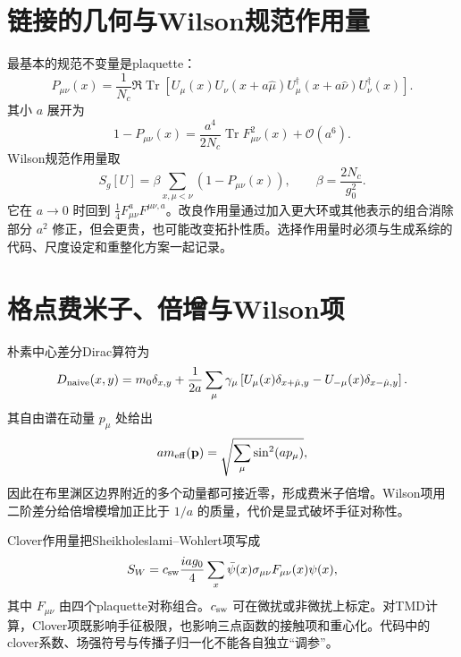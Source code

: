 \documentclass[UTF8,12pt,a4paper,twoside,openany]{ctexbook}
\newcommand{\Tr}{\operatorname{Tr}}
\begin{document}
\section{链接的几何与Wilson规范作用量}

最基本的规范不变量是plaquette：
\begin{equation}
  P_{\mu\nu}(x)
  =\frac{1}{N_c}\Re\Tr\left[
  U_\mu(x)U_\nu(x+a\hat\mu)
  U_\mu^\dagger(x+a\hat\nu)U_\nu^\dagger(x)
  \right].
  \label{eq:lattice-plaquette}
\end{equation}
其小 \(a\) 展开为
\begin{equation}
  1-P_{\mu\nu}(x)
  =\frac{a^4}{2N_c}\Tr F_{\mu\nu}^2(x)
  +\mathcal O(a^6).
  \label{eq:plaquette-expansion}
\end{equation}
Wilson规范作用量取
\begin{equation}
  S_g[U]
  =\beta\sum_{x,\mu<\nu}
  \left(1-P_{\mu\nu}(x)\right),
  \qquad
  \beta=\frac{2N_c}{g_0^2}.
  \label{eq:wilson-gauge-action}
\end{equation}
它在 \(a\to0\) 时回到 \(\frac14F_{\mu\nu}^aF^{\mu\nu,a}\)。改良作用量通过加入更大环或其他表示的组合消除部分 \(a^2\) 修正，但会更贵，也可能改变拓扑性质。选择作用量时必须与生成系综的代码、尺度设定和重整化方案一起记录。

\section{格点费米子、倍增与Wilson项}

朴素中心差分Dirac算符为
\begin{equation}
  D_{\rm naive}(x,y)
  =m_0\delta_{x,y}
  +\frac{1}{2a}\sum_\mu\gamma_\mu
  \left[U_\mu(x)\delta_{x+\hat\mu,y}
  -U_{-\mu}(x)\delta_{x-\hat\mu,y}\right].
  \label{eq:naive-dirac}
\end{equation}
其自由谱在动量 \(p_\mu\) 处给出
\begin{equation}
  am_{\rm eff}(\mathbf p)
  =\sqrt{\sum_\mu\sin^2(ap_\mu)},
  \label{eq:naive-spectrum}
\end{equation}
因此在布里渊区边界附近的多个动量都可接近零，形成费米子倍增。Wilson项用二阶差分给倍增模增加正比于 \(1/a\) 的质量，代价是显式破坏手征对称性。

Clover作用量把Sheikholeslami--Wohlert项写成
\begin{equation}
  S_W
  =c_{\rm sw}\frac{iag_0}{4}
  \sum_x\bar\psi(x)\sigma_{\mu\nu}F_{\mu\nu}(x)\psi(x),
  \label{eq:clover-action}
\end{equation}
其中 \(F_{\mu\nu}\) 由四个plaquette对称组合。\(c_{\rm sw}\) 可在微扰或非微扰上标定。对TMD计算，Clover项既影响手征极限，也影响三点函数的接触项和重心化。代码中的clover系数、场强符号与传播子归一化不能各自独立“调参”。
\end{document}

